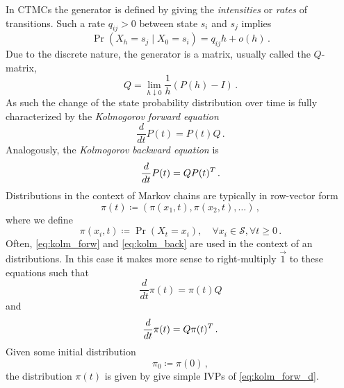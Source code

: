 In \acp{CTMC} the generator is defined by giving the \emph{intensities} or \emph{rates}
of transitions.
Such a rate $q_{ij} > 0$ between state $s_i$ and $s_j$ implies
\begin{equation}
	\Pr(X_{h} = s_j\mid X_0=s_i) = q_{ij}h + o(h)\,.
\end{equation}
Due to the discrete nature, the generator is a matrix, usually called the $Q$-matrix,
\begin{equation}
	Q = \lim_{h\downarrow 0}\frac{1}{h}\left(P(h) - I\right)\,.
\end{equation}
As such the change of the state probability distribution over time is fully characterized by the \emph{Kolmogorov forward equation}
\begin{equation}\label{eq:kolm_forw}
	\frac{d}{dt}P(t) = P(t)Q\,.
\end{equation}
Analogously, the \emph{Kolmogorov backward equation} is
\begin{equation}\label{eq:kolm_back}
	\frac{d}{dt}P(t) = QP(t)^{T}\,.
\end{equation}
Distributions in the context of Markov chains are typically in row-vector form
$$
\pi(t)\coloneqq(\pi(x_1, t), \pi(x_2, t), \dots)\,,
$$
where we define
$$
\pi(x_i, t)\coloneqq \Pr(X_t=x_i), \quad\forall x_i\in\mathcal{S}, \forall{t\geq 0}\,.
$$
Often, \eqref{eq:kolm_forw} and \eqref{eq:kolm_back} are used in the context of an
distributions.
In this case it makes more sense to right-multiply $\vec{1}$ to these equations such
that
\begin{equation}\label{eq:kolm_forw_d}
	\frac{d}{dt}\pi(t) = \pi(t)Q
\end{equation}
and
\begin{equation}\label{eq:kolm_back_d}
	\frac{d}{dt}\pi(t) = Q\pi(t)^{T}\,.
\end{equation}
Given some initial distribution
$$
\pi_0 \coloneqq \pi(0)\,,
$$
the distribution $\pi(t)$ is given by give simple \acp{IVP} of \eqref{eq:kolm_forw_d}.

